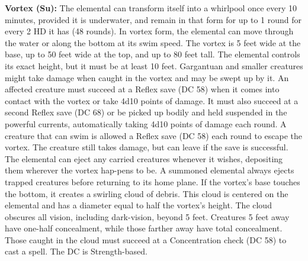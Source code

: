 \documentclass{article}
\begin{document}
\textbf{Vortex (Su):} The elemental can transform itself into a whirlpool once 
every 10 minutes, provided it is underwater, and remain in that form for up to 
1 round for every 2 HD it has (48 rounds). In vortex form, the elemental can move 
through the water or along the bottom at its swim speed. The vortex is 5 feet wide 
at the base, up to 50 feet wide at the top, and up to 80 feet tall. The elemental 
controls its exact height, but it must be at least 10 feet. Gargantuan and smaller 
creatures might take damage when caught in the vortex and may be swept up by it. 
An affected creature must succeed at a Reflex save (DC 58) when it comes into contact 
with the vortex or take 4d10 points of damage. It must also succeed at a second 
Reflex save (DC 68) or be picked up bodily and held suspended in the powerful currents, 
automatically taking 4d10 points of damage each round. A creature that can swim 
is allowed a Reflex save (DC 58) each round to escape the vortex. The creature 
still takes damage, but can leave if the save is successful. The elemental can 
eject any carried creatures whenever it wishes, depositing them wherever the vortex 
hap-pens to be. A summoned elemental always ejects trapped creatures before returning 
to its home plane. If the vortex's base touches the bottom, it creates a swirling 
cloud of debris. This cloud is centered on the elemental and has a diameter equal 
to half the vortex's height. The cloud obscures all vision, including dark-vision, 
beyond 5 feet. Creatures 5 feet away have one-half concealment, while those farther 
away have total concealment. Those caught in the cloud must succeed at a Concentration 
check (DC 58) to cast a spell.  The DC is Strength-based.

\newpage
\end{document}
